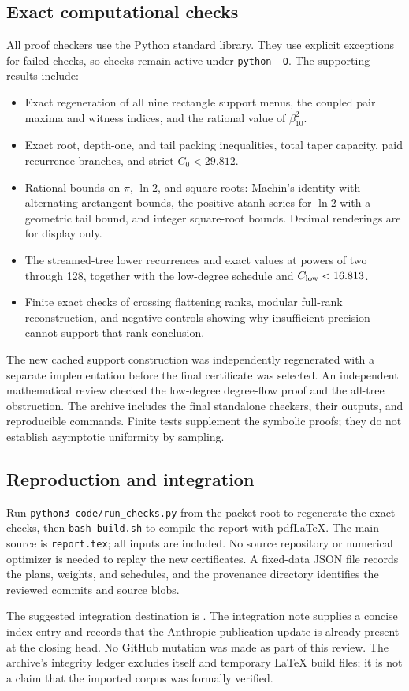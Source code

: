 \subsection{Exact computational checks}

All proof checkers use the Python standard library. They use explicit
exceptions for failed checks, so checks remain active under
\texttt{python -O}. The supporting results include:
\begin{itemize}
\item Exact regeneration of all nine rectangle support menus, the coupled
pair maxima and witness indices, and the rational value of $\beta_{10}^2$.
\item Exact root, depth-one, and tail packing inequalities, total taper
capacity, paid recurrence branches, and strict $C_0<29.812$.
\item Rational bounds on $\pi$, $\ln2$, and square roots: Machin's identity
with alternating arctangent bounds, the positive atanh series for $\ln2$
with a geometric tail bound, and integer square-root bounds. Decimal
renderings are for display only.
\item The streamed-tree lower recurrences and exact values at powers of
two through 128, together with the low-degree schedule and
$C_{\rm low}<16.813$.
\item Finite exact checks of crossing flattening ranks, modular full-rank
reconstruction, and negative controls showing why insufficient precision
cannot support that rank conclusion.
\end{itemize}

The new cached support construction was independently regenerated with a
separate implementation before the final certificate was selected. An
independent mathematical review checked the low-degree degree-flow proof
and the all-tree obstruction. The archive includes the final standalone
checkers, their outputs, and reproducible commands. Finite tests supplement
the symbolic proofs; they do not establish asymptotic uniformity by sampling.

\subsection{Reproduction and integration}

Run \texttt{python3 code/run\_checks.py} from the packet root to regenerate
the exact checks, then \texttt{bash build.sh} to compile the report with
pdfLaTeX. The main source is \texttt{report.tex}; all inputs are included.
No source repository or numerical optimizer is needed to replay the new
certificates. A fixed-data JSON file records the plans, weights, and
schedules, and the provenance directory identifies the reviewed commits
and source blobs.

The suggested integration destination is
.
The integration note supplies a concise index entry and records that the
Anthropic publication update is already present at the closing head.
No GitHub mutation was made as part of
this review. The archive's integrity ledger excludes itself and temporary
LaTeX build files; it is not a claim that the imported corpus was formally
verified.
